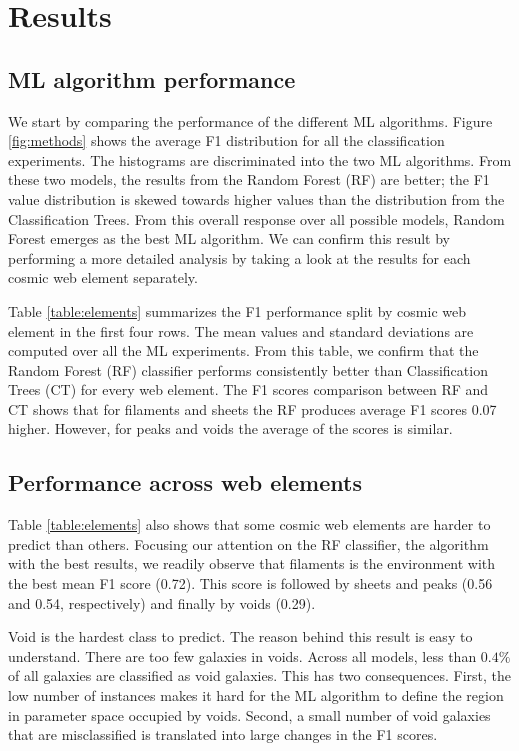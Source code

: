 \documentclass[usenatbib]{mnras}
\begin{document}
\section{Results}\label{sec:results}

\subsection{ML algorithm performance}


We start by comparing the performance of the different ML algorithms.
Figure \ref{fig:methods} shows the average F1 distribution for
all the classification experiments.
The histograms are discriminated into the two ML algorithms.
From these two models, the results from the Random Forest (RF) are
better; the F1 value distribution is skewed towards higher values than
the distribution from the Classification Trees.
From this overall response over all possible models, Random Forest
emerges as the best ML algorithm.
We can confirm this result by performing a more detailed analysis by
taking a look at the results for each cosmic web element separately.

Table \ref{table:elements} summarizes the F1 performance split by cosmic
web element in the first four rows.
The mean values and standard deviations are computed over all the ML experiments. 
From this table, we confirm that the Random Forest (RF) classifier performs
consistently better than Classification Trees (CT) for every web element.
The F1 scores comparison between RF and CT shows that for filaments and
sheets the RF produces average F1 scores 0.07 higher. 
However, for peaks and voids the average of the scores is similar. 

\subsection{Performance across web elements}

Table \ref{table:elements} also shows that some cosmic web elements 
are harder to predict than others.
Focusing our attention on the RF classifier, the algorithm with the
best results, we readily observe that filaments is the environment
with the best mean F1 score (0.72).
This score is followed by sheets and peaks (0.56 and 0.54,
respectively) and finally by voids (0.29).

Void is the hardest class to predict. 
The reason behind this result is easy to understand. 
There are too few galaxies in voids.
Across all models, less than $0.4\%$ of all galaxies
are classified as void galaxies.
This has two consequences.
First, the low number of instances makes it hard for the ML algorithm to
define the region in parameter space occupied by voids.
Second, a small number of void galaxies that are misclassified is translated into large changes in the F1 scores.
\end{document}
